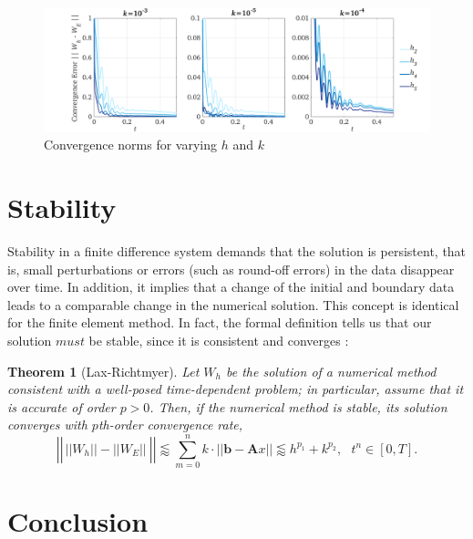 \documentclass[12pt]{article}
\newtheorem{theorem}{Theorem}
\begin{document}
\begin{figure}[H]
	\includegraphics[width=\linewidth, trim=2.5cm 0 .5cm 0,clip]{images/norms_1.png}
	\caption{Convergence norms for varying $h$ and $k$}\label{fig:convergence}
\end{figure}



\section{Stability}

Stability in a finite difference system demands that the solution is persistent, that is, small perturbations or errors (such as round-off errors) in the data disappear over time. In addition, it implies that a change of the initial and boundary data leads to a comparable change in the numerical solution. This concept is identical for the finite element method. In fact, the formal definition tells us that our solution $must$ be stable, since it is consistent and converges \cite{Tadmor2012}:

\begin{theorem}[Lax-Richtmyer]
	Let $W_h$ be the solution of a numerical method consistent with a well-posed time-dependent problem; in particular, assume that it is accurate of order $p>0$. Then, if the numerical method is stable, its solution converges with $p$th-order convergence rate,
	$$\left|\left|\frac{}{}||W_h|| - ||W_E||~\right|\right| \lessapprox \sum_{m=0}^n k\cdot ||\textbf{b}-\textbf{A}x|| \lessapprox h^{p_1} + k^{p_2}, ~~~t^n\in[0,T].$$
\end{theorem}

\section{Conclusion}
\end{document}
